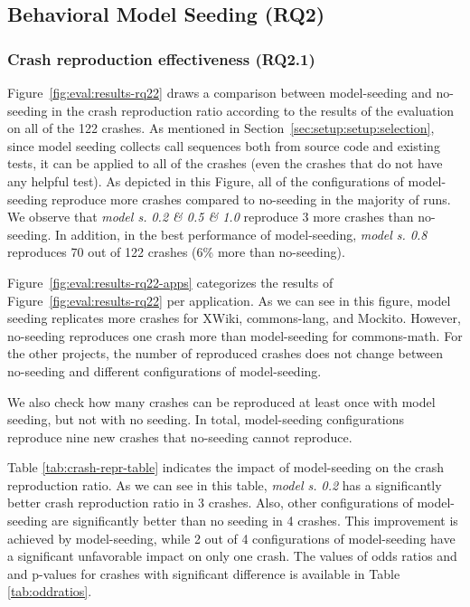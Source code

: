 \subsection{Behavioral Model Seeding (RQ2)}



\subsubsection{Crash reproduction effectiveness (\textbf{RQ2.1})}

Figure~\ref{fig:eval:results-rq22} draws a comparison between model-seeding and no-seeding in the crash reproduction ratio according to the results of the evaluation on all of the 122 crashes. As mentioned in Section~\ref{sec:setup:setup:selection}, since model seeding collects call sequences both from source code and existing tests, it can be applied to all of the crashes (even the crashes that do not have any helpful test). As depicted in this Figure, all of the configurations of model-seeding reproduce more crashes compared to no-seeding in the majority of runs. We observe that \textit{model s. 0.2 \& 0.5 \& 1.0} reproduce 3 more crashes than no-seeding. In addition, in the best performance of model-seeding, \textit{model s. 0.8} reproduces 70 out of 122 crashes (6\% more than no-seeding).


Figure~\ref{fig:eval:results-rq22-apps} categorizes the results of Figure~\ref{fig:eval:results-rq22} per application. As we can see in this figure, model seeding replicates more crashes for XWiki, commons-lang, and Mockito. However, no-seeding reproduces one crash more than model-seeding for commons-math. For the other projects, the number of reproduced crashes does not change between no-seeding and different configurations of model-seeding. 

We also check how many crashes can be reproduced at least once with model seeding, but not with no seeding. In total, model-seeding configurations reproduce nine new crashes that no-seeding cannot reproduce.

Table \ref{tab:crash-repr-table} indicates the impact of model-seeding on the crash reproduction ratio. As we can see in this table, \textit{model s. 0.2} has a significantly better crash reproduction ratio in 3 crashes. Also, other configurations of model-seeding are significantly better than no seeding in 4 crashes. This improvement is achieved by model-seeding, while 2 out of 4 configurations of model-seeding have a significant unfavorable impact on only one crash. The values of odds ratios and and p-values for crashes with significant difference is available in Table \ref{tab:oddratios}.


